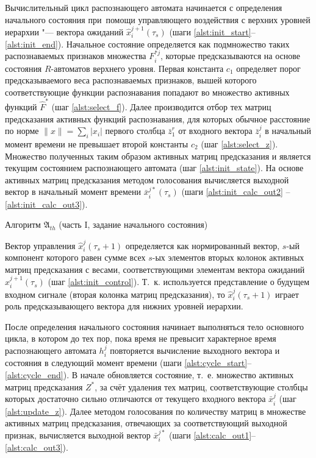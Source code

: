 Вычислительный цикл распознающего автомата начинается с определения начального состояния при~помощи управляющего воздействия с верхних уровней иерархии "--- вектора ожиданий $\hat x_i^{j+1}(\tau_s)$ (шаги \ref{alst:init_start}--\ref{alst:init_end}). Начальное состояние определяется как подмножество таких распознаваемых признаков множества $F_i^{*j}$, которые предсказываются на основе состояния $R$-автоматов верхнего уровня. Первая константа $c_1$ определяет порог предсказываемого веса распознаваемых признаков, вышей которого соответствующие функции распознавания попадают во множество активных функций $\hat F^*$ (шаг \ref{alst:select_f}). Далее производится отбор тех матриц предсказания активных функций распознавания, для которых обычное расстояние по норме $\|x\|=\sum_i |x_i|$ первого столбца $\bar z_1^r$ от входного вектора $\bar z_i^j$ в начальный момент времени не превышает второй константы $c_2$ (шаг \ref{alst:select_z}). Множество полученных таким образом активных матриц предсказания и является текущим состоянием распознающего автомата (шаг \ref{alst:init_state}). На основе активных матриц предсказания методом голосования вычисляется выходной вектор в начальный момент времени $\bar x_i^{j*}(\tau_s)$ (шаги \ref{alst:init_calc_out2} -- \ref{alst:init_calc_out3}).

\begin{algorithm}[H]
	\caption{Алгоритм $\mathfrak{A}_{th}$ (часть I, задание начального состояния)}\label{alg:th_init}
	\begin{algorithmic}[1]
		
	\end{algorithmic}
\end{algorithm}
	
Вектор управления $\hat x_i^j(\tau_s+1)$ определяется как нормированный вектор, $s$-ый компонент которого равен сумме всех $s$-ых элементов вторых колонок активных матриц предсказания с весами, соответствующими элементам вектора ожиданий $\hat x_i^{j+1}(\tau_s)$ (шаг \ref{alst:init_control}). Т.~к. используется представление о будущем входном сигнале (вторая колонка матриц предсказания), то $\hat x_i^j(\tau_s+1)$ играет роль предсказывающего вектора для нижних уровней иерархии.

После определения начального состояния начинает выполняться тело основного цикла, в котором до тех пор, пока время не превысит характерное время распознающего автомата $h_i^j$ повторяется вычисление выходного вектора и состояния в следующий момент времени (шаги \ref{alst:cycle_start}--\ref{alst:cycle_end}). В начале обновляется состояние, т.~е. множество активных матриц предсказания $Z^*$, за счёт удаления тех матриц, соответствующие столбцы которых достаточно сильно отличаются от текущего входного вектора $\bar x_i^j$ (шаг \ref{alst:update_z}). Далее методом голосования по количеству матриц в множестве активных матриц предсказания, отвечающих за соответствующий выходной признак, вычисляется выходной вектор $\bar x_i^{j*}$ (шаги \ref{alst:calc_out1}--\ref{alst:calc_out3}).

